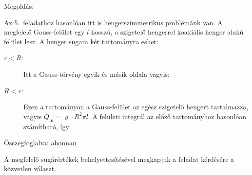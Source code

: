 
\ifdefined\megoldas
 
 Megoldás: 

 Az 5.~feladathoz hasonlóan itt is hengerszimmetrikus problémánk van.  A megfelelő Gauss-felület egy $l$ hosszú, a szigetelő hengerrel koaxiális henger alakú felület lesz. A henger sugara két tartományra eshet:
 \begin{description}
  \item [$r<R$:]
   Itt a Gauss-törvény egyik és másik oldala
   vagyis:
   
  \item [$R<r$:]
   Ezen a tartományon a Gauss-felület az egész szigetelő hengert tartalmazza, vagyis $Q_\text{in}=\varrho \cdot R^2\pi l$. A felületi integrál az előző tartományhoz hasonlóan számítható, így
   
 \end{description}

 Összegfoglalva:
 ahonnan

 A megfelelő sugárértékek behelyettesítésével megkapjuk a feladat kérdésére a közvetlen választ. 

\fi
